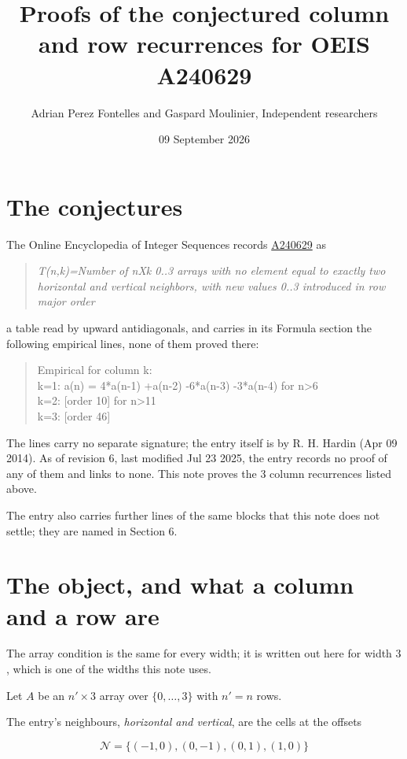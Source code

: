 \documentclass[11pt]{article}
\title{Proofs of the conjectured column and row recurrences for OEIS A240629}
\author{Adrian Perez Fontelles and Gaspard Moulinier, Independent researchers}
\date{09 September 2026}
\theoremstyle{definition}
\begin{document}
\maketitle
\section{The conjectures}

The Online Encyclopedia of Integer Sequences records \href{https://oeis.org/A240629}{A240629} as

\begin{quote}\itshape T(n,k)=Number of nXk 0..3 arrays with no element equal to exactly two horizontal and vertical neighbors, with new values 0..3 introduced in row major order\end{quote}

a table read by upward antidiagonals, and carries in its Formula section the following empirical lines, none of them proved there:

\begin{quote}\ttfamily Empirical for column k:\\
k=1: a(n) = 4*a(n-1) +a(n-2) -6*a(n-3) -3*a(n-4) for n>6\\k=2: [order 10] for n>11\\k=3: [order 46]\end{quote}

The lines carry no separate signature; the entry itself is by R. H. Hardin (Apr 09 2014). As of revision 6, last modified Jul 23 2025, the entry records no proof of any of them and links to none. This note proves the 3 column recurrences listed above.

The entry also carries further lines of the same blocks that this note does not settle; they are named in Section 6.

\section{The object, and what a column and a row are}

The array condition is the same for every width; it is written out here for width $3$, which is one of the widths this note uses.

Let $A$ be an $n' \times 3$ array over $\{0,\dots,3\}$ with $n' = n$ rows.

The entry's neighbours, {\itshape horizontal and vertical}, are the cells at the offsets

\[\mathcal{N} = \{(-1,0), (0,-1), (0,1), (1,0)\}\]
\end{document}
